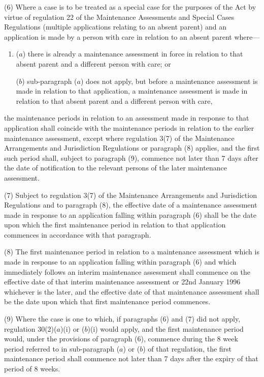 \documentclass[a4paper,12pt]{article}
\begin{document}
(6) Where a case is to be treated as a special case for the purposes of the Act by virtue of regulation 22 of the Maintenance Assessments and Special Cases Regulations (multiple applications relating to an absent parent) and an application is made by a person with care in relation to an absent parent where—
\begin{enumerate}\item[]
($a$) there is already a maintenance assessment in force in relation to that absent parent and a different person with care; or

($b$) sub-paragraph ($a$) does not apply, but before a maintenance assessment is made in relation to that application, a maintenance assessment is made in relation to that absent parent and a different person with care,
\end{enumerate}
the maintenance periods in relation to an assessment made in response to that application shall coincide with the maintenance periods in relation to the earlier maintenance assessment, except where regulation 3(7) of the Maintenance Arrangements and Jurisdiction Regulations or paragraph (8) applies, and the first such period shall, subject to paragraph (9), commence not later than 7 days after the date of notification to the relevant persons of the later maintenance assessment.

(7) Subject to regulation 3(7) of the Maintenance Arrangements and Jurisdiction Regulations and to paragraph (8), the effective date of a maintenance assessment made in response to an application falling within paragraph (6) shall be the date upon which the first maintenance period in relation to that application commences in accordance with that paragraph.

(8) The first maintenance period in relation to a maintenance assessment which is made in response to an application falling within paragraph (6) and which immediately follows an interim maintenance assessment shall commence on the effective date of that interim maintenance assessment or 22nd January 1996 whichever is the later, and the effective date of that maintenance assessment shall be the date upon which that first maintenance period commences.

(9) Where the case is one to which, if paragraphs (6) and (7) did not apply, regulation 30(2)($a$)(i) or ($b$)(i) would apply, and the first maintenance period would, under the provisions of paragraph (6), commence during the 8 week period referred to in sub-paragraph ($a$) or ($b$) of that regulation, the first maintenance period shall commence not later than 7 days after the expiry of that period of 8 weeks.
\end{document}
